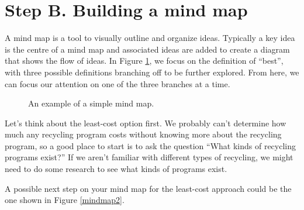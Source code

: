 \newpage

\section*{Step B. Building a mind map}\label{mindmap}

A mind map is a tool to visually outline and organize ideas. Typically a key idea is the centre of a mind map and associated ideas are added to create a diagram that shows the flow of ideas. In Figure \ref{mindmap1}, we focus on the definition of ``best'', with three possible definitions
branching off to be further explored. From here, we can focus our attention on one of the three branches
at a time.

\begin{figure}[!htbp]
\caption{An example of a simple mind map.}
\label{mindmap1}
\end{figure}


Let's think about the least-cost option first. We probably can't determine how much any recycling program costs without knowing more about the recycling program, so a good place to start is to ask the question ``What kinds of recycling programs exist?''
If we aren't familiar with different types of recycling, we might need to do some research to see what kinds of programs exist.


A possible next step on your mind map for the least-cost approach could be the one shown in Figure \ref{mindmap2}.

